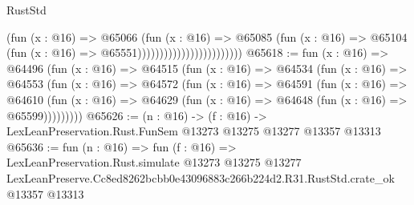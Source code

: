 \begin{lexlean}{RustStd}
\begin{coremodule}
                                            (fun (x : @16) =>
                                            @65066
                                              (fun (x : @16) =>
                                              @65085
                                                (fun (x : @16) =>
                                                @65104
                                                  (fun (x : @16) => @65551))))))))))))))))))))))))
@65618 := fun (x : @16) =>
  @64496
    (fun (x : @16) =>
    @64515
      (fun (x : @16) =>
      @64534
        (fun (x : @16) =>
        @64553
          (fun (x : @16) =>
          @64572
            (fun (x : @16) =>
            @64591
              (fun (x : @16) =>
              @64610
                (fun (x : @16) => @64629 (fun (x : @16) => @64648 (fun (x : @16) => @65599)))))))))
@65626 := (n : @16) ->
  (f : @16) -> LexLeanPreservation.Rust.FunSem @13273 @13275 @13277 @13357 @13313
@65636 := fun (n : @16) =>
  fun (f : @16) =>
  LexLeanPreservation.Rust.simulate
    @13273
    @13275
    @13277
    LexLeanPreserve.Cc8ed8262bcbb0e43096883c266b224d2.R31.RustStd.crate_ok
    @13357
    @13313
\end{coremodule}
\end{lexlean}
